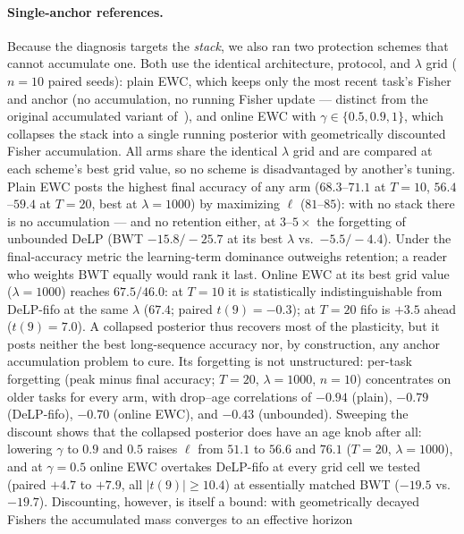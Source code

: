 \documentclass[review,12pt,number]{elsarticle}
\newcommand{\delp}{DeLP}
\begin{document}
\paragraph{Single-anchor references.}
\label{sec:exp-references}
Because the diagnosis targets the \emph{stack}, we also ran two
protection schemes that cannot accumulate one. Both use the identical
architecture, protocol, and $\lambda$ grid ($n{=}10$ paired seeds):
plain EWC, which keeps only the most recent task's Fisher and anchor
(no accumulation, no running Fisher update --- distinct from the
original accumulated variant of~\cite{kirkpatrick2017}), and online
EWC \cite{chaudhry2018} with $\gamma \in \{0.5, 0.9, 1\}$, which
collapses the stack into a single running posterior with geometrically
discounted Fisher accumulation. All arms share the identical
$\lambda$ grid and are compared at each scheme's best grid value, so
no scheme is disadvantaged by another's tuning. Plain EWC posts the
highest final accuracy
of any arm ($68.3$--$71.1$ at $T{=}10$, $56.4$--$59.4$ at $T{=}20$,
best at $\lambda{=}1000$) by maximizing $\ell$ ($81$--$85$): with no
stack there is no accumulation --- and no retention either, at
$3$--$5\times$ the forgetting of unbounded \delp{} (BWT
$-15.8/-25.7$ at its best $\lambda$ vs.\ $-5.5/-4.4$). Under the
final-accuracy metric the learning-term dominance outweighs retention;
a reader who weights BWT equally would rank it last. Online EWC at its
best grid value ($\lambda{=}1000$) reaches $67.5/46.0$: at $T{=}10$ it
is statistically indistinguishable from \delp{}-fifo at the same
$\lambda$ ($67.4$; paired $t(9){=}-0.3$); at $T{=}20$ fifo is $+3.5$
ahead ($t(9){=}7.0$). A collapsed posterior thus recovers most of the
plasticity, but it posts neither the best long-sequence accuracy nor,
by construction, any anchor accumulation problem to cure. Its
forgetting is not unstructured: per-task forgetting (peak minus
final accuracy; $T{=}20$, $\lambda{=}1000$, $n{=}10$) concentrates on
older tasks for every arm, with drop--age correlations of $-0.94$
(plain), $-0.79$ (\delp{}-fifo), $-0.70$ (online EWC), and $-0.43$
(unbounded). Sweeping the discount shows that the collapsed posterior
does have an age knob after all: lowering $\gamma$ to $0.9$ and $0.5$
raises $\ell$ from $51.1$ to $56.6$ and $76.1$ ($T{=}20$,
$\lambda{=}1000$), and at $\gamma{=}0.5$ online EWC overtakes
\delp{}-fifo at every grid cell we tested (paired $+4.7$ to $+7.9$,
all $|t(9)|\geq10.4$) at essentially matched BWT ($-19.5$ vs.\
$-19.7$). Discounting, however, is itself a bound: with geometrically
decayed Fishers the accumulated mass converges to an effective horizon
\end{document}
